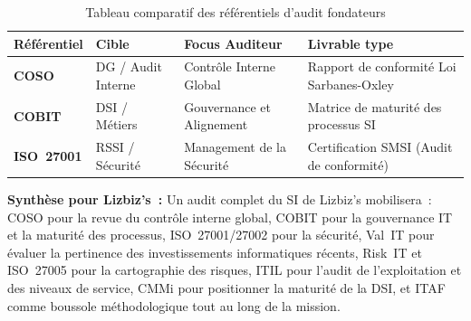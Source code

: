 \begin{table}[h!]
\centering
\small
\renewcommand{\arraystretch}{1.5}
\begin{tabular}{|p{2.5cm}|p{2.5cm}|p{4.5cm}|p{3.5cm}|}
    \hline
    \rowcolor{blue!10} \textbf{Référentiel} & \textbf{Cible} & \textbf{Focus Auditeur} &
    \textbf{Livrable type} \\ \hline
    \textbf{COSO} & DG / Audit Interne & Contrôle Interne Global &
    Rapport de conformité Loi Sarbanes-Oxley \\ \hline
    \textbf{COBIT} & DSI / Métiers & Gouvernance et Alignement &
    Matrice de maturité des processus SI \\ \hline
    \textbf{ISO~27001} & RSSI / Sécurité & Management de la Sécurité &
    Certification SMSI (Audit de conformité) \\ \hline
\end{tabular}
\caption{Tableau comparatif des référentiels d'audit fondateurs}
\end{table}

\begin{boxlizbiz}
\textbf{Synthèse pour Lizbiz's~:}
Un audit complet du SI de Lizbiz's mobilisera~: COSO pour la revue du contrôle interne global,
COBIT pour la gouvernance IT et la maturité des processus, ISO~27001/27002 pour la sécurité,
Val~IT pour évaluer la pertinence des investissements informatiques récents, Risk~IT et
ISO~27005 pour la cartographie des risques, ITIL pour l'audit de l'exploitation et des niveaux
de service, CMMi pour positionner la maturité de la DSI, et ITAF comme boussole méthodologique
tout au long de la mission.
\end{boxlizbiz}
